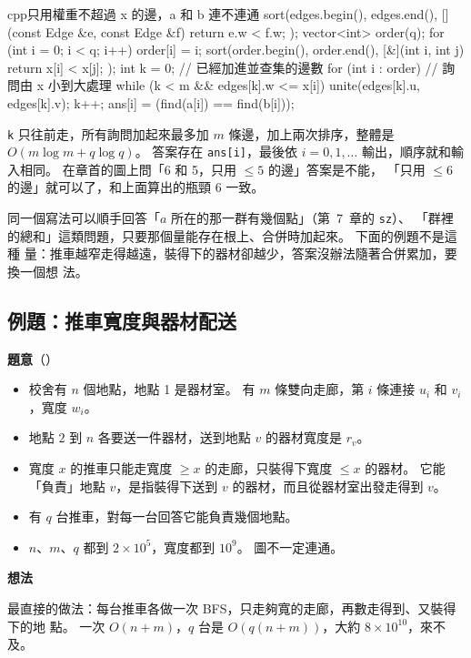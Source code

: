 \begin{code}{cpp}{只用權重不超過 x 的邊，a 和 b 連不連通}
sort(edges.begin(), edges.end(),
     [](const Edge &e, const Edge &f) { return e.w < f.w; });
vector<int> order(q);
for (int i = 0; i < q; i++) {
    order[i] = i;
}
sort(order.begin(), order.end(), [&](int i, int j) { return x[i] < x[j]; });
int k = 0;                              // 已經加進並查集的邊數
for (int i : order) {                   // 詢問由 x 小到大處理
    while (k < m && edges[k].w <= x[i]) {
        unite(edges[k].u, edges[k].v);
        k++;
    }
    ans[i] = (find(a[i]) == find(b[i]));
}
\end{code}

\texttt{k} 只往前走，所有詢問加起來最多加 $m$ 條邊，加上兩次排序，整體是
$O(m \log m + q \log q)$。 答案存在 \texttt{ans[i]}，最後依 $i = 0, 1, \ldots$
輸出，順序就和輸入相同。 在章首的圖上問「6 和 5，只用 $\le 5$ 的邊」答案是不能，
「只用 $\le 6$ 的邊」就可以了，和上面算出的瓶頸 $6$ 一致。

同一個寫法可以順手回答「$a$ 所在的那一群有幾個點」（第~7~章的 \texttt{sz}）、
「群裡的總和」這類問題，只要那個量能存在根上、合併時加起來。 下面的例題不是這種
量：推車越窄走得越遠，裝得下的器材卻越少，答案沒辦法隨著合併累加，要換一個想
法。

\subsection{例題：推車寬度與器材配送}
\label{sec:ex-carts}

\textbf{題意}（）

\begin{itemize}
\item 校舍有 $n$ 個地點，地點 1 是器材室。 有 $m$ 條雙向走廊，第 $i$ 條連接 $u_i$
和 $v_i$，寬度 $w_i$。
\item 地點 $2$ 到 $n$ 各要送一件器材，送到地點 $v$ 的器材寬度是 $r_v$。
\item 寬度 $x$ 的推車只能走寬度 $\ge x$ 的走廊，只裝得下寬度 $\le x$ 的器材。 它能
「負責」地點 $v$，是指裝得下送到 $v$ 的器材，而且從器材室出發走得到 $v$。
\item 有 $q$ 台推車，對每一台回答它能負責幾個地點。
\item $n$、$m$、$q$ 都到 $2 \times 10^5$，寬度都到 $10^9$。 圖不一定連通。
\end{itemize}

\textbf{想法}

最直接的做法：每台推車各做一次 BFS，只走夠寬的走廊，再數走得到、又裝得下的地
點。 一次 $O(n + m)$，$q$ 台是 $O(q(n + m))$，大約 $8 \times 10^{10}$，來不及。

